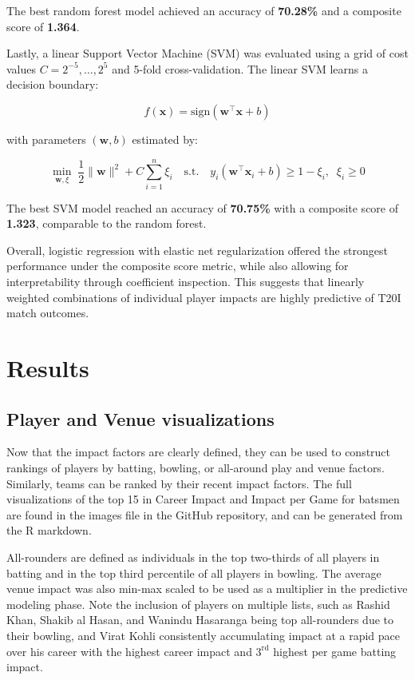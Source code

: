 \documentclass{article}[12pt]
\begin{document}
The best random forest model achieved an accuracy of \textbf{70.28\%} and a composite score of \textbf{1.364}.  

Lastly, a linear Support Vector Machine (SVM) was evaluated using a grid of cost values $C = 2^{-5}, \dots, 2^5$ and 5-fold cross-validation. \parencite{e1071} The linear SVM learns a decision boundary:  

\begin{equation}
f(\mathbf{x}) = \mathrm{sign}\left( \mathbf{w}^\top \mathbf{x} + b \right)
\end{equation}

with parameters $(\mathbf{w}, b)$ estimated by:  

\begin{equation}
\min_{\mathbf{w}, \xi} \; \frac{1}{2}\|\mathbf{w}\|^2 + C \sum_{i=1}^{n} \xi_i
\quad \text{s.t.} \quad
y_i (\mathbf{w}^\top \mathbf{x}_i + b) \geq 1 - \xi_i, \;\; \xi_i \geq 0
\end{equation}

The best SVM model reached an accuracy of \textbf{70.75\%} with a composite score of \textbf{1.323}, comparable to the random forest.  

Overall, logistic regression with elastic net regularization offered the strongest performance under the composite score metric, while also allowing for interpretability through coefficient inspection. This suggests that linearly weighted combinations of individual player impacts are highly predictive of T20I match outcomes.






\section{Results} \label{sec:results}

\subsection{Player and Venue visualizations}
Now that the impact factors are clearly defined, they can be used to construct rankings of players by batting, bowling, or all-around play and venue factors. Similarly, teams can be ranked by their recent impact factors. The full visualizations of the top 15 in Career Impact and Impact per Game for batsmen are found in the images file in the GitHub repository, and can be generated from the R markdown. 

All-rounders are defined as individuals in the top two-thirds of all players in batting and in the top third percentile of all players in bowling. The average venue impact was also min-max scaled to be used as a multiplier in the predictive modeling phase. Note the inclusion of players on multiple lists, such as Rashid Khan, Shakib al Hasan, and Wanindu Hasaranga being top all-rounders due to their bowling, and Virat Kohli consistently accumulating impact at a rapid pace over his career with the highest career impact and $3^{\text{rd}}$ highest per game batting impact.
\end{document}
